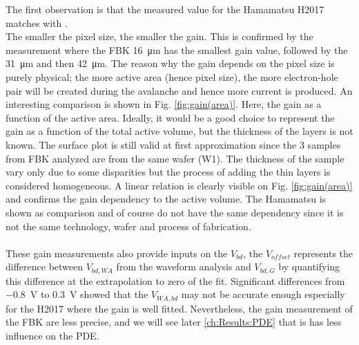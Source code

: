 The first observation is that the measured value for the Hamamatsu H2017 matches with \cite{Girard2018CharacterisationDistributions}. 
\\
The smaller the pixel size, the smaller the gain. This is confirmed by the measurement where the FBK \SI{16}{\micro m} has the smallest gain value, followed by the \SI{31}{\micro m} and then \SI{42}{\micro m}. The reason why the gain depends on the pixel size is purely physical; the more active area (hence pixel size), the more electron-hole pair will be created during the avalanche and hence more current is produced. 
An interesting comparison is shown in Fig. \ref{fig:gain(area)}. Here, the gain as a function of the active area. Ideally, it would be a good choice to represent the gain as a function of the total active volume, but the thickness of the layers is not known. The surface plot is still valid at first approximation since the 3 samples from FBK analyzed are from the same wafer (W1). The thickness of the sample vary only due to some disparities but the process of adding the thin layers is considered homogeneous. A linear relation is clearly visible on Fig. \ref{fig:gain(area)} and confirms the gain dependency to the active volume. The Hamamatsu is shown as comparison and of course do not have the same dependency since it is not the same technology, wafer and process of fabrication. \\
\\
These gain measurements also provide inputs on the $V_{bd}$, the $V_{offset}$ represents the difference between $V_{bd,WA}$ from the waveform analysis and $V_{bd,G}$ by quantifying this difference at the extrapolation to zero of the fit. Significant differences from \SI{-0.8}{\volt} to \SI{+0.3}{\volt} showed that the $V_{WA,bd}$ may not be accurate enough especially for the H2017 where the gain is well fitted. Nevertheless, the gain measurement of the FBK are less precise, and we will see later \ref{ch:Results:PDE} that is has less influence on the PDE. 


